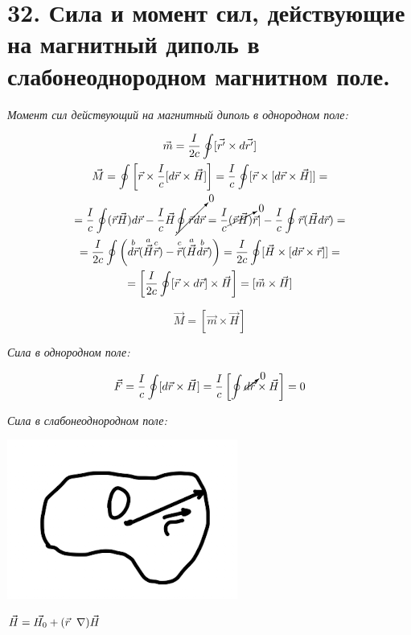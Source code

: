 \section*{32. Сила и момент сил, действующие на магнитный диполь в
слабонеоднородном магнитном поле.}

\textit{Момент сил действующий на магнитный диполь в однородном поле:}

\begin{gather*}
    \vec{m}=\frac{I}{2c} \oint [\vec{r'}\times d \vec{r'}] \\
    \vec{M}=\oint \left[ \vec{r}\times \frac{I}{c} [d\vec{r}\times \vec{H}]  \right]=\frac{I}{c}\oint [\vec{r}\times [d\vec{r}\times \vec{H}]]= \\
    =\frac{I}{c}\oint (\vec{r}\vec{H})d\vec{r} -\frac{I}{c}\vec{H} \cancelto{0}{\oint \vec{r}d\vec{r}}=\frac{I}{c} \cancelto{0}{(\vec{r}\vec{H})}\vec{r}|-\frac{I}{c}\oint \vec{r}(\vec{H}d\vec{r})= \\
    =\frac{I}{2c}\oint \left( \overset{b}{d\vec{r}}(\overset{a}{\vec{H}}\overset{c}{\vec{r}})-\overset{c}{\vec{r}}(\overset{a}{\vec{H}}\overset{b}{d\vec{r}}) \right)=\frac{I}{2c}\oint[\vec{H}\times [d\vec{r}\times \vec{r}]]= \\
    =\left[ \frac{I}{2c}\oint[\vec{r}\times d\vec{r}]\times \vec{H}  \right]=[\vec{m}\times \vec{H}]     
\end{gather*}

\[
\boxed{\vec{M}=[\vec{m}\times \vec{H}]}
\]

\textit{Сила в однородном поле:}

\[
\vec{F}=\frac{I}{c}\oint [d\vec{r}\times \vec{H}]=\frac{I}{c} \left[ \oint \cancelto{0}{d\vec{r}}\times \vec{H} \right] =0
\]

\textit{Сила в слабонеоднородном поле:}

\begin{minipage}[c]{0.25\textwidth} %
    \includegraphics[width=\textwidth]{im/71.png} %
\end{minipage}%
\hfill
\begin{minipage}[c]{0.55\textwidth} %
    \( \vec{H}=\vec{H_0}+(\vec{r}\hspace{0.2cm}\scriptsize \nabla)\vec{H} \) 
\end{minipage}

